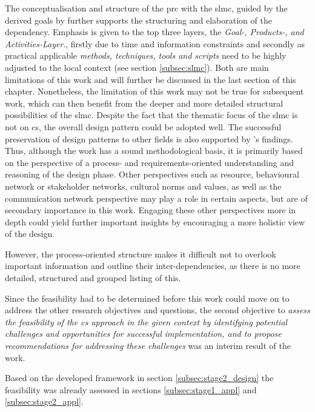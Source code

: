 The conceptualisation and structure of the \acrshort{prc} with the \acrlong{slmc}, guided by the derived goals by \autocite{minkmanCitizenScienceWater2015} further supports the structuring and elaboration of the dependency. Emphasis is given to the top three layers, the \textit{Goal-, Products-, and Activities-Layer}., firstly due to time and information constraints and secondly as practical applicable\textit{ methods, techniques, tools and scripts} need to be highly adjusted to the local context (see section \ref{subsec:slmc}). Both are main limitations of this work and will further be discussed in the last section of this chapter. Nonetheless, the limitation of this work may not be true for subsequent work, which can then benefit from the deeper and more detailed structural possibilities of the \acrshort{slmc}. Despite the fact that the thematic focus of the \acrshort{slmc} is not on \acrshort{cs}, the overall design pattern could be adopted well. The successful preservation of design patterns to other fields is also supported by \autocite{diggelenGroundedDesignDesign2009}'s findings. Thus, although the work has a sound methodological basis, it is primarily based on the perspective of a process- and requirements-oriented understanding and reasoning of the design phase. Other perspectives such as resource, behavioural network or stakeholder networks, cultural norms and values, as well as the communication network perspective may play a role in certain aspects, but are of secondary importance in this work. Engaging these other perspectives more in depth could yield further important insights by encouraging a more holistic view of the design.



However, the process-oriented structure makes it difficult not to overlook important information and outline their inter-dependencies, as there is no more detailed, structured and grouped listing of this. 




Since the feasibility had to be determined before this work could move on to address the other research objectives and questions, the second objective to \textit{assess the feasibility of the \acrlong{cs} approach in the given context by identifying potential challenges and opportunities for successful implementation, and to propose recommendations for addressing these challenges} was an interim result of the work. 

Based on the developed framework in section \ref{subsec:stage2_design} the feasibility was already assessed in sections \ref{subsec:stage1_appl} and \ref{subsec:stage2_appl}. 

